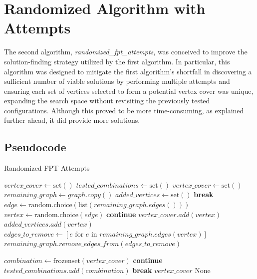 \section{Randomized Algorithm with Attempts}

The second algorithm, \textit{randomized\_fpt\_attempts}, was conceived to improve the solution-finding strategy utilized by the first algorithm. In particular, this algorithm was designed to mitigate the first algorithm's shortfall in discovering a sufficient number of viable solutions by performing multiple attempts and ensuring each set of vertices selected to form a potential vertex cover was unique, expanding the search space without revisiting the previously tested configurations.
Although this proved to be more time-consuming, as explained further ahead, it did provide more solutions.

\subsection{Pseudocode}
\begin{algorithm}
\caption{Randomized FPT Attempts}
\begin{algorithmic}[1]
\State $vertex\_cover \gets \text{set}()$
\State $tested\_combinations \gets \text{set}()$
\State $vertex\_cover \gets \text{set}()$
\State $remaining\_graph \gets graph.copy()$
\State $added\_vertices \gets \text{set}()$
\State \textbf{break}
\EndIf
\State $edge \gets \text{random.choice}(\text{list}(remaining\_graph.edges()))$
\State $vertex \gets \text{random.choice}(edge)$
\State \textbf{continue}
\EndIf
\State $vertex\_cover.add(vertex)$
\State $added\_vertices.add(vertex)$
\State $edges\_to\_remove \gets [e \text{ for } e \text{ in } remaining\_graph.edges(vertex)]$
\State $remaining\_graph.remove\_edges\_from

(edges\_to\_remove)$


\EndWhile
\State $combination \gets \text{frozenset}(vertex\_cover)$
\State \textbf{continue}
\EndIf
\State $tested\_combinations.add(combination)$
\State \textbf{break}
\EndIf
\EndFor
{}
\State \Return $vertex\_cover$
\Else
\State \Return $\text{None}$
\EndIf
\EndProcedure
\end{algorithmic}
\end{algorithm}

